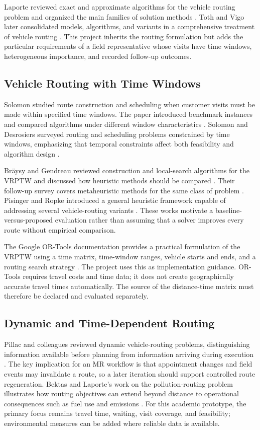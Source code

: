 \documentclass[12pt,a4paper,oneside]{report}
\begin{document}
Laporte reviewed exact and approximate algorithms for the vehicle routing problem and organized the main families of solution methods \cite{laporte1992}. Toth and Vigo later consolidated models, algorithms, and variants in a comprehensive treatment of vehicle routing \cite{tothvigo2014}. This project inherits the routing formulation but adds the particular requirements of a field representative whose visits have time windows, heterogeneous importance, and recorded follow-up outcomes.

\subsection{Vehicle Routing with Time Windows}
Solomon studied route construction and scheduling when customer visits must be made within specified time windows. The paper introduced benchmark instances and compared algorithms under different window characteristics \cite{solomon1987}. Solomon and Desrosiers surveyed routing and scheduling problems constrained by time windows, emphasizing that temporal constraints affect both feasibility and algorithm design \cite{solomonDesrosiers1988}.

Br\"aysy and Gendreau reviewed construction and local-search algorithms for the VRPTW and discussed how heuristic methods should be compared \cite{braysy2005a}. Their follow-up survey covers metaheuristic methods for the same class of problem \cite{braysy2005b}. Pisinger and Ropke introduced a general heuristic framework capable of addressing several vehicle-routing variants \cite{pisinger2007}. These works motivate a baseline-versus-proposed evaluation rather than assuming that a solver improves every route without empirical comparison.

The Google OR-Tools documentation provides a practical formulation of the VRPTW using a time matrix, time-window ranges, vehicle starts and ends, and a routing search strategy \cite{ortoolsVRPTW}. The project uses this as implementation guidance. OR-Tools requires travel costs and time data; it does not create geographically accurate travel times automatically. The source of the distance-time matrix must therefore be declared and evaluated separately.

\subsection{Dynamic and Time-Dependent Routing}
Pillac and colleagues reviewed dynamic vehicle-routing problems, distinguishing information available before planning from information arriving during execution \cite{pillac2013}. The key implication for an MR workflow is that appointment changes and field events may invalidate a route, so a later iteration should support controlled route regeneration. Bektas and Laporte's work on the pollution-routing problem illustrates how routing objectives can extend beyond distance to operational consequences such as fuel use and emissions \cite{bektas2011}. For this academic prototype, the primary focus remains travel time, waiting, visit coverage, and feasibility; environmental measures can be added where reliable data is available.
\end{document}
